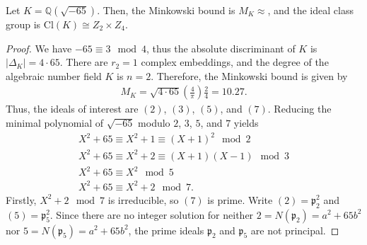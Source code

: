 \begin{exmbox}
    \begin{example}
        Let \(K = \mathbb{Q}(\sqrt{-65})\). Then, the Minkowski bound is \(M_K \approx\), and the ideal class group is \(\mathrm{Cl}(K) \cong Z_2 \times Z_4\).
    \end{example}
\end{exmbox}
\begin{proof}
    We have \(-65 \equiv 3 \mod{4}\), thus the absolute discriminant of \(K\) is \(|\Delta_K| = 4 \cdot 65\). There are \(r_2 = 1\) complex embeddings, and the degree of the algebraic number field \(K\) is \(n = 2\). Therefore, the Minkowski bound is given by
    \begin{align*}
        M_K = \sqrt{4 \cdot 65} \left(\frac{4}{\pi}\right) \frac{2}{4} = 10.27 \text{.}
    \end{align*}
    Thus, the ideals of interest are \((2)\), \((3)\), \((5)\), and \((7)\). Reducing the minimal polynomial of \(\sqrt{-65}\) modulo \(2\), \(3\), \(5\), and \(7\) yields
    \begin{align*}
        X^2 + 65 \equiv X^2 + 1 \equiv (X + 1)^2 \mod{2} \\
        X^2 + 65 \equiv X^2 + 2 \equiv (X + 1)(X - 1) \mod{3} \\
        X^2 + 65 \equiv X^2 \mod{5} \\
        X^2 + 65 \equiv X^2 + 2 \mod{7} \text{.}
    \end{align*}
    Firstly, \(X^2 + 2 \mod{7}\) is irreducible, so \((7)\) is prime. Write \((2) = \mathfrak{p}_2^2\) and \((5) = \mathfrak{p}_5^2\). Since there are no integer solution for neither \(2 = N(\mathfrak{p}_2) = a^2 + 65 b^2\) nor \(5 = N(\mathfrak{p}_5) = a^2 + 65 b^2\), the prime ideals \(\mathfrak{p}_2\) and \(\mathfrak{p}_5\) are not principal.
\end{proof}